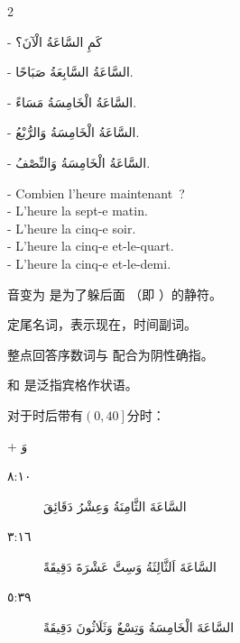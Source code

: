 \begin{multicols}{2}
    \begin{Arabic}%
        - كَمِ السَّاعَةُ الْآنَ؟

        - السَّاعَةُ السَّابِعَةُ صَبَاحًا. 

        - السَّاعَةُ الْخَامِسَةُ مَسَاءً.

        - السَّاعَةُ الْخَامِسَةُ وَالرُّبْعُ.

        - السَّاعَةُ الْخَامِسَةُ وَالنِّصْفُ.
    \end{Arabic} 

    \begin{note}
        - Combien l'heure maintenant~?\\
        - L'heure la sept-e matin.\\
        - L'heure la cinq-e soir.\\
        - L'heure la cinq-e et-le-quart.\\
        - L'heure la cinq-e et-le-demi.
    \end{note}
\end{multicols}

\begin{attention}
     音变为  是为了躲后面  （即  ）的静符。

     定尾名词，表示现在，时间副词。

    整点回答序数词与  配合为阴性确指。

     和  是泛指宾格作状语。
\end{attention}

对于时后带有$\left( 0, 40 \right]$分时：

\begin{Arabic}
    \begin{center}
        \tto {} + وَ \tto
    \end{center}
\end{Arabic}

\begin{Arabic}
    \begin{description}
        \item[٨:١٠] السَّاعَةَ الثَّامِنَةُ وَعِشْرُ دَقَائِقَ
        \item[٣:١٦] السَّاعَةَ اَلثَّالِثَةُ وَسِتَّ عَشْرَةَ دَقِيقَةً
        \item[٥:٣٩] السَّاعَةَ الْخَامِسَةُ وَتِسْعٌ وَثَلَاثُونَ دَقِيقَةً
    \end{description}
\end{Arabic}

